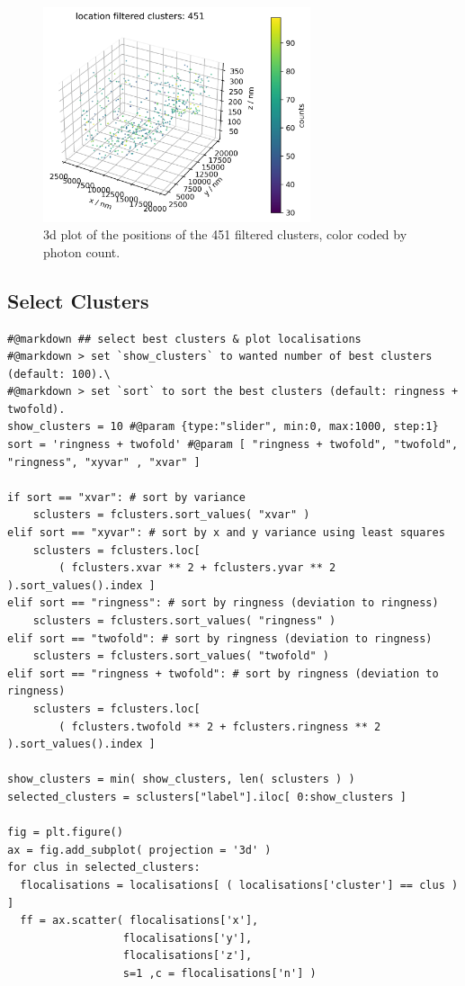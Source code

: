 \documentclass[11pt, a4paper, oneside, twocolumn]{report}
\begin{document}
\begin{figure}[h!]
  \centering
  \includegraphics[width=0.7\textwidth]{7_filtered_clusters.png}
  \caption{3d plot of the positions of the 451 filtered clusters,
    color coded by photon count.}
  \label{f:7_filtered_clusters}
\end{figure}


\subsection{Select Clusters}

\begin{verbatim}
#@markdown ## select best clusters & plot localisations
#@markdown > set `show_clusters` to wanted number of best clusters (default: 100).\
#@markdown > set `sort` to sort the best clusters (default: ringness + twofold).
show_clusters = 10 #@param {type:"slider", min:0, max:1000, step:1}
sort = 'ringness + twofold' #@param [ "ringness + twofold", "twofold", "ringness", "xyvar" , "xvar" ]

if sort == "xvar": # sort by variance
    sclusters = fclusters.sort_values( "xvar" )
elif sort == "xyvar": # sort by x and y variance using least squares
    sclusters = fclusters.loc[
        ( fclusters.xvar ** 2 + fclusters.yvar ** 2 ).sort_values().index ]
elif sort == "ringness": # sort by ringness (deviation to ringness)
    sclusters = fclusters.sort_values( "ringness" )
elif sort == "twofold": # sort by ringness (deviation to ringness)
    sclusters = fclusters.sort_values( "twofold" )
elif sort == "ringness + twofold": # sort by ringness (deviation to ringness)
    sclusters = fclusters.loc[
        ( fclusters.twofold ** 2 + fclusters.ringness ** 2 ).sort_values().index ]

show_clusters = min( show_clusters, len( sclusters ) )
selected_clusters = sclusters["label"].iloc[ 0:show_clusters ]

fig = plt.figure()
ax = fig.add_subplot( projection = '3d' )
for clus in selected_clusters:
  flocalisations = localisations[ ( localisations['cluster'] == clus ) ]
  ff = ax.scatter( flocalisations['x'],
                  flocalisations['y'],
                  flocalisations['z'],
                  s=1 ,c = flocalisations['n'] )
\end{verbatim}
\end{document}
